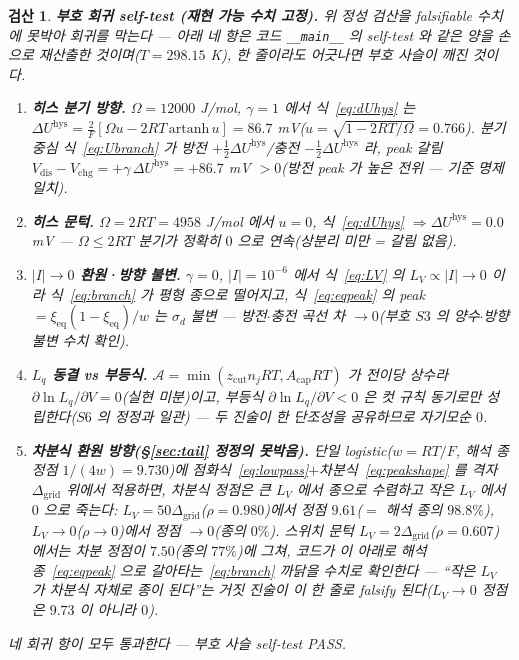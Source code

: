 \documentclass[11pt,a4paper]{article}
\newtheorem*{verifybox}{검산}
\newcommand{\eq}{\mathrm{eq}}
\newcommand{\dis}{\mathrm{dis}}
\newcommand{\chg}{\mathrm{chg}}
\newcommand{\hys}{\mathrm{hys}}
\newcommand{\code}[1]{\texttt{#1}}
\begin{document}
\begin{verifybox}
\textbf{부호 회귀 self-test (재현 가능 수치 고정).} 위 정성 검산을 falsifiable 수치에 못박아 회귀를 막는다 --- 아래
네 항은 코드 \code{\_\_main\_\_} 의 self-test 와 같은 양을 손으로 재산출한 것이며($T=298.15$ K), 한 줄이라도 어긋나면
부호 사슬이 깨진 것이다.
\begin{enumerate}[label=\textbf{R\arabic*.},leftmargin=2.6em,itemsep=1pt]
\item \textbf{히스 분기 방향.} $\Omega=12000$ J/mol, $\gamma=1$ 에서 식~\eqref{eq:dUhys} 는
$\Delta U^\hys=\frac{2}{F}[\Omega u-2RT\,\mathrm{artanh}\,u]=86.7$ mV($u=\sqrt{1-2RT/\Omega}=0.766$). 분기 중심
식~\eqref{eq:Ubranch} 가 방전 $+\tfrac12\Delta U^\hys$/충전 $-\tfrac12\Delta U^\hys$ 라, peak 갈림
$V_\dis-V_\chg=+\gamma\,\Delta U^\hys=+86.7$ mV $>0$(방전 peak 가 높은 전위 --- 기준 명제 일치).
\item \textbf{히스 문턱.} $\Omega=2RT=4958$ J/mol 에서 $u=0$, 식~\eqref{eq:dUhys} $\Rightarrow\Delta U^\hys=0.0$ mV ---
$\Omega\le2RT$ 분기가 정확히 $0$ 으로 연속(상분리 미만 = 갈림 없음).
\item \textbf{$|I|\!\to\!0$ 환원·방향 불변.} $\gamma=0$, $|I|=10^{-6}$ 에서 식~\eqref{eq:LV} 의 $L_V\propto|I|\to0$ 이라
식~\eqref{eq:branch} 가 평형 종으로 떨어지고, 식~\eqref{eq:eqpeak} 의 peak $=\xi_\eq(1-\xi_\eq)/w$ 는 $\sigma_d$ 불변 ---
방전$\cdot$충전 곡선 차 $\to0$(부호 $S3$ 의 양수$\cdot$방향 불변 수치 확인).
\item \textbf{$L_q$ 동결 vs 부등식.} $\mathcal A=\min(z_\mathrm{cut}n_jRT,A_\mathrm{cap}RT)$ 가 전이당 상수라
$\partial\ln L_q/\partial V=0$(실현 미분)이고, 부등식 $\partial\ln L_q/\partial V<0$ 은 컷 규칙 동기로만 성립한다($S6$ 의
정정과 일관) --- 두 진술이 한 단조성을 공유하므로 자기모순 $0$.
\item \textbf{차분식 환원 방향(\S\ref{sec:tail} 정정의 못박음).} 단일 logistic($w=RT/F$, 해석 종 정점
$1/(4w)=9.730$)에 점화식~\eqref{eq:lowpass}$+$차분식~\eqref{eq:peakshape} 를 격자 $\Delta_\mathrm{grid}$ 위에서
적용하면, 차분식 정점은 \emph{큰 $L_V$ 에서} 종으로 수렴하고 \emph{작은 $L_V$ 에서 $0$ 으로 죽는다}:
$L_V=50\Delta_\mathrm{grid}$($\rho=0.980$)에서 정점 $9.61$($=$ 해석 종의 $98.8\%$), $L_V\!\to\!0$($\rho\!\to\!0$)에서
정점 $\to0$(종의 $0\%$). 스위치 문턱 $L_V=2\Delta_\mathrm{grid}$($\rho=0.607$)에서는 차분 정점이 $7.50$(종의 $77\%$)에
그쳐, 코드가 이 아래로 해석 종~\eqref{eq:eqpeak} 으로 갈아타는~\eqref{eq:branch} 까닭을 수치로 확인한다 --- ``작은
$L_V$ 가 차분식 자체로 종이 된다''는 거짓 진술이 이 한 줄로 falsify 된다($L_V\!\to\!0$ 정점은 $9.73$ 이 아니라 $0$).
\end{enumerate}
네 회귀 항이 모두 통과한다 --- 부호 사슬 self-test PASS.
\end{verifybox}
\end{document}
